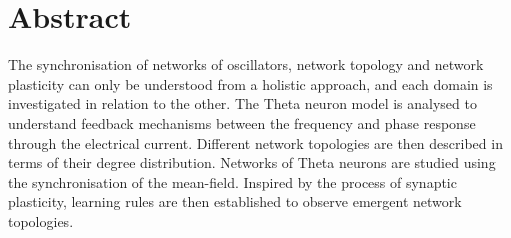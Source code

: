 



\mainmatter


\tableofcontents

\section*{Abstract}
The synchronisation of networks of oscillators, network topology and network plasticity can only be understood from a holistic approach, and each domain is investigated in relation to the other. The Theta neuron model is analysed to understand feedback mechanisms between the frequency and phase response through the electrical current. Different network topologies are then described in terms of their degree distribution. Networks of Theta neurons are studied using the synchronisation of the mean-field. Inspired by the process of synaptic plasticity, learning rules are then established to observe emergent network topologies. 

%




\renewcommand{\thepage}{\arabic{page}}









\newpage

\small{}




